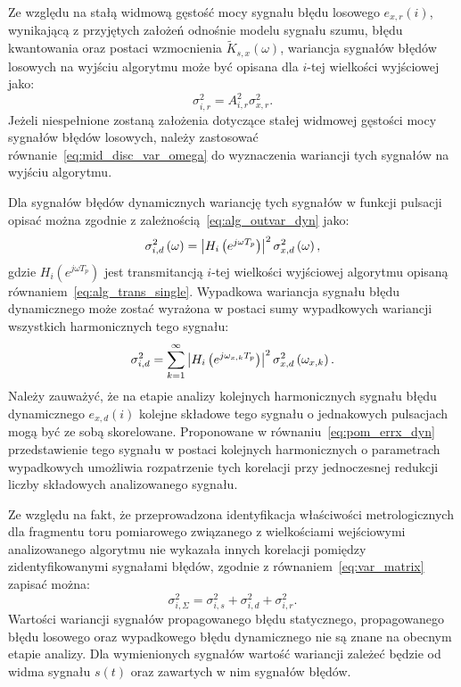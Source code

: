 Ze względu na stałą widmową gęstość mocy sygnału błędu losowego $e_{x,r}(i)$, wynikającą z przyjętych założeń odnośnie modelu sygnału szumu, błędu kwantowania oraz postaci wzmocnienia $\tilde{K}_{s,x}(\omega)$, wariancja sygnałów błędów losowych na wyjściu algorytmu może być opisana dla $i$-tej wielkości wyjściowej jako:
\begin{equation}
\sigma_{i,r}^{2} = A_{i,r}^{2} \sigma_{x,r}^{2} \label{eq:pom_varout_rand}.
\end{equation}
Jeżeli niespełnione zostaną założenia dotyczące stałej widmowej gęstości mocy sygnałów błędów losowych, należy zastosować równanie~\eqref{eq:mid_disc_var_omega} do wyznaczenia wariancji tych sygnałów na wyjściu algorytmu.

Dla sygnałów błędów dynamicznych wariancję tych sygnałów w funkcji pulsacji opisać można zgodnie z zależnością~\eqref{eq:alg_outvar_dyn} jako:
\begin{equation}
\sigma_{i,d}^{2} \left(\omega\right) = \left| H_{i} \left(e^{j \omega T_{p}}\right) \right|^{2} \sigma_{x,d}^{2} \left(\omega\right) \label{eq:pom_varout_dyn},
\end{equation}
gdzie $H_{i}(e^{j \omega T_{p}})$ jest transmitancją $i$-tej wielkości wyjściowej algorytmu opisaną równaniem~\eqref{eq:alg_trans_single}. Wypadkowa wariancja sygnału błędu dynamicznego może zostać wyrażona w postaci sumy wypadkowych wariancji wszystkich harmonicznych tego sygnału:
\begin{equation}
\sigma_{i,d}^{2} = \sum _{k=1} ^{\infty} \left| H_{i} \left(e^{j \omega_{x,k} T_{p}}\right) \right|^{2} \sigma_{x,d}^{2} \left(\omega_{x,k}\right) \label{eq:pom_varout_dyn_sum}.
\end{equation}
Należy zauważyć, że na etapie analizy kolejnych harmonicznych sygnału błędu dynamicznego $e_{x,d}(i)$ kolejne składowe tego sygnału o jednakowych pulsacjach mogą być ze sobą skorelowane. Proponowane w równaniu~\eqref{eq:pom_errx_dyn} przedstawienie tego sygnału w postaci kolejnych harmonicznych o parametrach wypadkowych umożliwia rozpatrzenie tych korelacji przy jednoczesnej redukcji liczby składowych analizowanego sygnału.

Ze względu na fakt, że przeprowadzona identyfikacja właściwości metrologicznych dla fragmentu toru pomiarowego związanego z wielkościami wejściowymi analizowanego algorytmu nie wykazała innych korelacji pomiędzy zidentyfikowanymi sygnałami błędów, zgodnie z równaniem~\eqref{eq:var_matrix} zapisać można:
\begin{equation}
\sigma_{i,\Sigma}^{2} = \sigma_{i,s}^{2} + \sigma_{i,d}^{2} + \sigma_{i,r}^{2} \label{eq:pom_varout_sum}.
\end{equation}
Wartości wariancji sygnałów propagowanego błędu statycznego, propagowanego błędu losowego oraz wypadkowego błędu dynamicznego nie są znane na obecnym etapie analizy. Dla wymienionych sygnałów wartość wariancji zależeć będzie od widma sygnału $s(t)$ oraz zawartych w nim sygnałów błędów.

